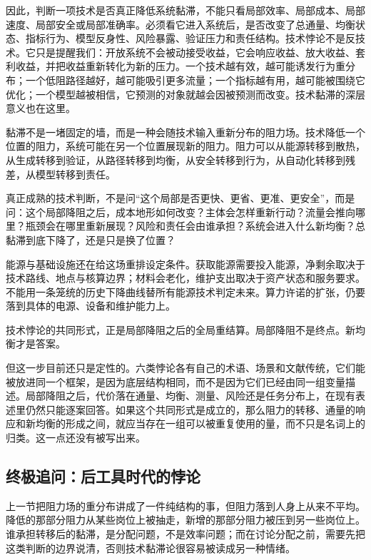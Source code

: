 因此，判断一项技术是否真正降低系统黏滞，不能只看局部效率、局部成本、局部速度、局部安全或局部准确率。必须看它进入系统后，是否改变了总通量、均衡状态、指标行为、模型反身性、风险暴露、验证压力和责任结构。技术悖论不是反技术。它只是提醒我们：开放系统不会被动接受收益，它会响应收益、放大收益、套利收益，并把收益重新转化为新的压力。一个技术越有效，越可能诱发行为重分布；一个低阻路径越好，越可能吸引更多流量；一个指标越有用，越可能被围绕它优化；一个模型越被相信，它预测的对象就越会因被预测而改变。技术黏滞的深层意义也在这里。

黏滞不是一堵固定的墙，而是一种会随技术输入重新分布的阻力场。技术降低一个位置的阻力，系统可能在另一个位置展现新的阻力。阻力可以从能源转移到散热，从生成转移到验证，从路径转移到均衡，从安全转移到行为，从自动化转移到残差，从模型转移到责任。

真正成熟的技术判断，不是问“这个局部是否更快、更省、更准、更安全”，而是问：这个局部降阻之后，成本地形如何改变？主体会怎样重新行动？流量会推向哪里？瓶颈会在哪里重新展现？风险和责任会由谁承担？系统会进入什么新均衡？总黏滞到底下降了，还是只是换了位置？

能源与基础设施还在给这场重排设定条件。获取能源需要投入能源，净剩余取决于技术路线、地点与核算边界；材料会老化，维护支出取决于资产状态和服务要求。不能用一条笼统的历史下降曲线替所有能源技术判定未来。算力许诺的扩张，仍要落到具体的电源、设备和维护能力上。

技术悖论的共同形式，正是局部降阻之后的全局重结算。局部降阻不是终点。新均衡才是答案。

但这一步目前还只是定性的。六类悖论各有自己的术语、场景和文献传统，它们能被放进同一个框架，是因为底层结构相同，而不是因为它们已经由同一组变量描述。局部降阻之后，代价落在通量、均衡、测量、风险还是任务分布上，在现有表述里仍然只能逐案回答。如果这个共同形式是成立的，那么阻力的转移、通量的响应和新均衡的形成之间，就应当存在一组可以被重复使用的量，而不只是名词上的归类。这一点还没有被写出来。

\subsection{终极追问：后工具时代的悖论}

上一节把阻力场的重分布讲成了一件纯结构的事，但阻力落到人身上从来不平均。降低的那部分阻力从某些岗位上被抽走，新增的那部分阻力被压到另一些岗位上。谁承担转移后的黏滞，是分配问题，不是效率问题；而在讨论分配之前，需要先把这类判断的边界说清，否则技术黏滞论很容易被读成另一种情绪。


